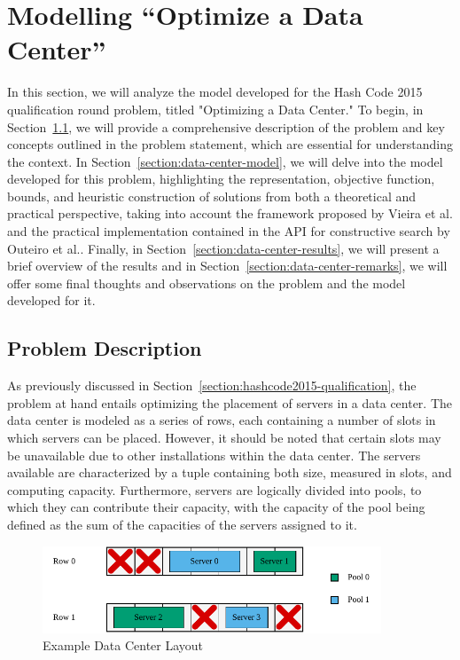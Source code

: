 \section{Modelling ``Optimize a Data Center''}
\label{section:data-center}

In this section, we will analyze the model developed for the Hash Code 2015
qualification round problem, titled "Optimizing a Data Center." To begin, in
Section~\ref{section:data-center-problem}, we will provide a comprehensive
description of the problem and key concepts outlined in the problem statement,
which are essential for understanding the context. In
Section~\ref{section:data-center-model}, we will delve into the model developed
for this problem, highlighting the representation, objective function, bounds,
and heuristic construction of solutions from both a theoretical and practical
perspective, taking into account the framework proposed by Vieira et
al.\cite{vieira2009uma} and the practical implementation contained in the API
for constructive search by Outeiro et al.\cite{outeiro2021application}. Finally,
in Section~\ref{section:data-center-results}, we will present a brief overview
of the results and in Section~\ref{section:data-center-remarks}, we will offer
some final thoughts and observations on the problem and the model developed for
it.

\subsection{Problem Description}
\label{section:data-center-problem}

As previously discussed in Section~\ref{section:hashcode2015-qualification}, the
problem at hand entails optimizing the placement of servers in a data center.
The data center is modeled as a series of rows, each containing a
number of slots in which servers can be placed.
However, it should be noted that certain slots may be unavailable
due to other installations within the data center. The servers available are
characterized by a tuple containing both size, measured in slots, and computing
capacity. Furthermore, servers are logically divided into pools,
to which they can contribute their capacity, with the capacity of the pool being
defined as the sum of the capacities of the servers assigned to it.

\begin{figure}[h]
  \centering
  \includegraphics[width=0.9\textwidth,keepaspectratio]{../assets/dc/dc-example.pdf}
  \caption{Example Data Center Layout}
  \label{fig:data-center-layout}
\end{figure}

